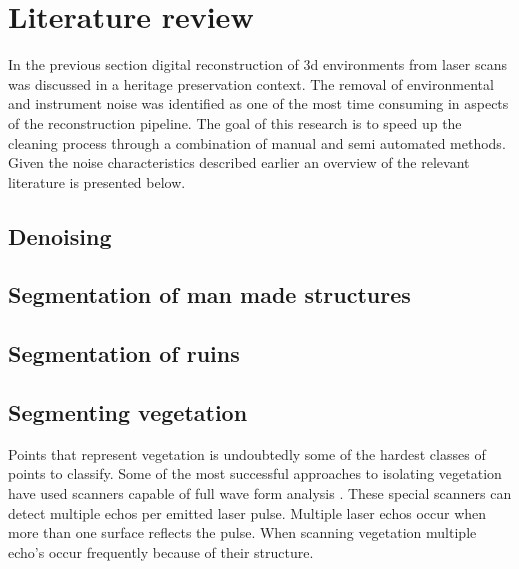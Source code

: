 \chapter{Literature review} \label{ch:lit}

In the previous section digital reconstruction of 3d environments from laser scans was discussed in a heritage preservation context. The removal of environmental and instrument noise was identified as one of the most time consuming in aspects of the reconstruction pipeline. The goal of this research is to speed up the cleaning process through a combination of manual and semi automated methods. Given the noise characteristics described earlier an overview of the relevant literature is presented below.\\









\section{Denoising}

\section{Segmentation of man made structures}

\section{Segmentation of ruins}

\section{Segmenting vegetation}

Points that represent vegetation is undoubtedly some of the hardest classes of points to classify. Some of the most successful approaches to isolating vegetation have used scanners capable of full wave form analysis \cite{Reitberger2009, Elseberg2011}. These special scanners can detect multiple echos per emitted laser pulse. Multiple laser echos occur when more than one surface reflects the pulse. When scanning vegetation multiple echo's occur frequently because of their structure.\\

